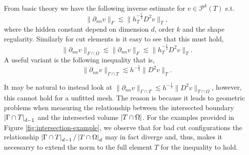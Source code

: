 From basic theory we have the following inverse estimate for $ v \in \mathcal{P}^{k}( T)$ s.t. \[
     \| \partial _{nn}  v \|_{F   }^{ }  \lesssim  \| h_{T}^{-\frac{1}{2}} D ^2 v \|_{ T }^{  },
\]
where the hidden constant depend on dimension $d$, order $k$ and the shape regularity. Similarly for cut elements is it easy to see that this must hold,
\begin{equation*}
     \| \partial _{nn}  v \|_{F \cap \Omega    }^{  }  \lesssim\| \partial _{nn}  v \|_{F }^{  }  \lesssim   \| h_{T}^{-\frac{1}{2}} D ^2 v \|_{ T }^{  }.
\end{equation*}
A useful variant is the following inequality that is,
\begin{equation*}
\| \partial _{nn} v \|_{ \Gamma \cap T  }^{  } \lesssim h^{-\frac{1}{2}} \| D^2 v \|_{ T }^{  }.
\end{equation*}
\begin{remark}
    It may be natural to instead look at $\| \partial _{nn} v \|_{ \Gamma \cap T  }^{  } \lesssim h^{-\frac{1}{2}} \| D^2 v \|_{ T\cap \Omega  }^{  }$, however, this cannot hold for a unfitted mesh. The reason is because it leads to geometric
    problems when measuring the relationship between the intersected boundary $\left\lvert  \Gamma \cap T  \right\rvert_{d-1} $ and the intersected volume $\left\lvert  T\cap \Omega  \right\rvert$. For the examples provided in
    Figure \ref{fig:intersection-example}, we observe that for bad cut configurations the relationship $ \left\lvert  \Gamma \cap T  \right\rvert_{d-1} / \left\lvert  T\cap \Omega  \right\rvert_{d}   $ may in fact diverge and, thus, makes it necessarry to extend the norm to the full element $T$ for the inequality to hold.
\end{remark}


